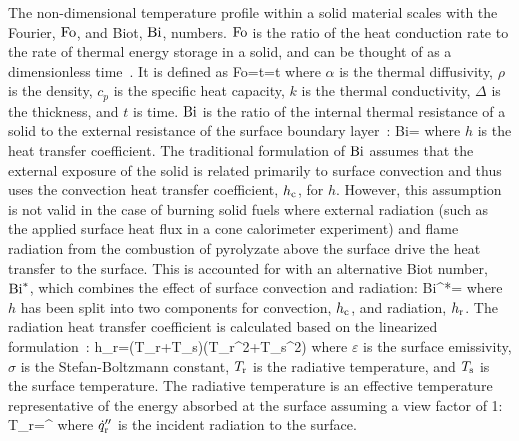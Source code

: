 The non-dimensional temperature profile within a solid material scales with the  Fourier, $\hbox{Fo}$, and Biot, $\hbox{Bi}$, numbers. $\hbox{Fo}$ is the ratio of the heat conduction rate to the rate of thermal energy storage in a solid, and can be thought of as a dimensionless time~\cite{Incropera:1}. It is defined as
\be
\hbox{Fo}=t=t
\label{fo_eq}
\ee
where $\alpha$ is the thermal diffusivity, $\rho$ is the density, $c_{p}$ is the specific heat capacity, $k$ is the thermal conductivity, $\Delta$ is the thickness, and $t$ is time. $\hbox{Bi}$ is the ratio of the internal thermal resistance of a solid to the external resistance of the surface boundary layer~\cite{Incropera:1}:
\be
\hbox{Bi}=
\ee
where $h$ is the heat transfer coefficient. The traditional formulation of $\hbox{Bi}$ assumes that the external exposure of the solid is related primarily to surface convection and thus uses the convection heat transfer coefficient, $h_{\rm c}$, for $h$. However, this assumption is not valid in the case of burning solid fuels where external radiation (such as the applied surface heat flux in a cone calorimeter experiment) and flame radiation from the combustion of pyrolyzate above the surface drive the heat transfer to the surface. This is accounted for with an alternative Biot number, $\hbox{Bi}^*$, which combines the effect of surface convection and radiation:
\be
\hbox{Bi}^*=
\label{bi_eq}
\ee
where $h$ has been split into two components for convection, $h_{\rm c}$, and radiation, $h_{\rm r}$. The radiation heat transfer coefficient is calculated based on the linearized formulation~\cite{Incropera:1}:
\be
h_{\rm r}=\varepsilon\sigma\left(T_{\rm r}+T_{{\rm s}}\right)\left(T_{\rm r}^2+T_{{\rm s}}^2\right)
\ee
where $\varepsilon$ is the surface emissivity, $\sigma$ is the Stefan-Boltzmann constant, $T_{\rm r}$ is the radiative temperature, and $T_{{\rm s}}$ is the surface temperature. The radiative temperature is an effective temperature representative of the energy absorbed at the surface assuming a view factor of 1:
\be
T_{\rm r}=^\of
\label{eq:tr}
\ee
where $\dot{q}_{\rm r}''$ is the incident radiation to the surface.

